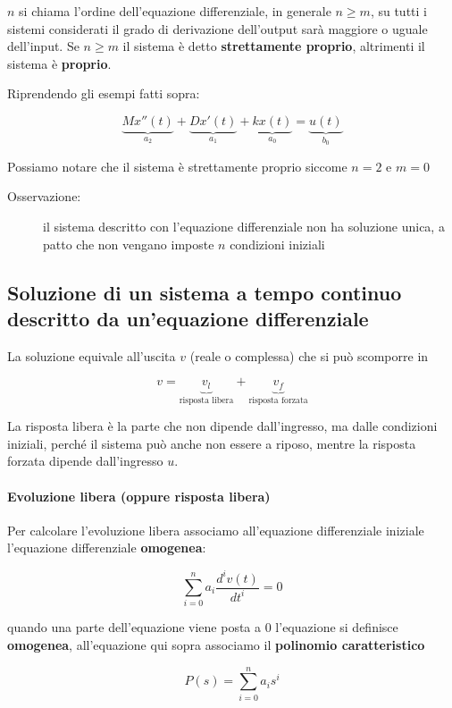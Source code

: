 \documentclass[a4paper, 12pt]{book}
\theoremstyle{plain}
\begin{document}
$n$ si chiama l'ordine dell'equazione differenziale, in generale $n \ge m$, su tutti i sistemi considerati il grado 
di derivazione dell'output sarà maggiore o uguale dell'input. Se $n \ge m$ il sistema è detto \textbf{strettamente proprio}, altrimenti
il sistema è \textbf{proprio}.

Riprendendo gli esempi fatti sopra:

\[
    \underbrace{Mx''(t)}_{a_2} + \underbrace{Dx'(t)}_{a_1} + \underbrace{kx(t)}_{a_0} = \underbrace{u(t)}_{b_0}
\]

Possiamo notare che il sistema è strettamente proprio siccome $n = 2$ e $m = 0$

\begin{description}
    \item[Osservazione:] il sistema descritto con l'equazione differenziale non ha soluzione unica, a patto che non vengano imposte $n$ condizioni iniziali 
\end{description}

\subsection{Soluzione di un sistema a tempo continuo descritto da un'equazione differenziale}

La soluzione equivale all'uscita $v$ (reale o complessa) che si può scomporre in 

\[
    v = \underbrace{v_l}_{\textrm{risposta libera}} + \underbrace{v_f}_{\textrm{risposta forzata}}
\]

La risposta libera è la parte che non dipende dall'ingresso, ma dalle condizioni iniziali, perché il sistema può anche non essere a riposo, 
mentre la risposta forzata dipende dall'ingresso $u$. 

\paragraph{Evoluzione libera (oppure risposta libera)}

Per calcolare l'evoluzione libera associamo all'equazione differenziale iniziale l'equazione differenziale \textbf{omogenea}:

\[
    \sum_{i = 0}^n a_i \frac{d^iv(t)}{dt^i} = 0
\]

quando una parte dell'equazione viene posta a 0 l'equazione si definisce \textbf{omogenea}, all'equazione qui sopra 
associamo il \textbf{polinomio caratteristico}

\[
    P(s) = \sum_{i = 0}^n a_i s^i
\]
\end{document}
